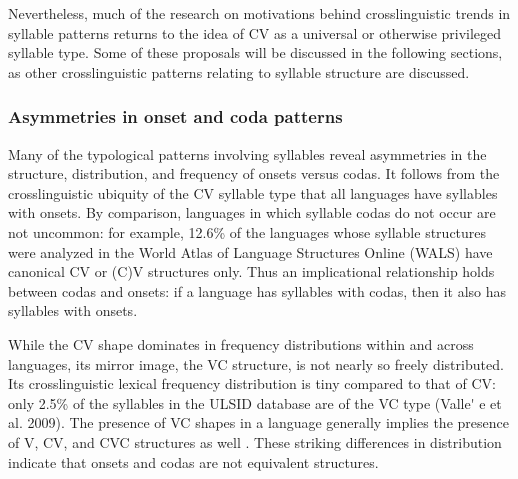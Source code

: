   Nevertheless, much of the research on motivations behind crosslinguistic trends in syllable patterns returns to the idea of CV as a universal or otherwise privileged syllable type. Some of these proposals will be discussed in the following sections, as other crosslinguistic patterns relating to syllable structure are discussed.

\subsubsection{{Asymmetries} {in} {onset} {and} {coda} {patterns}}\label{sec:1.1.2.2}

  Many of the typological patterns involving syllables reveal asymmetries in the structure, distribution, and frequency of onsets versus codas. It follows from the crosslinguistic ubiquity of the CV syllable type that all languages have syllables with onsets. By comparison, languages in which syllable codas do not occur are not uncommon: for example, 12.6\% of the languages whose syllable structures were analyzed in the World Atlas of Language Structures Online (WALS) have canonical CV or (C)V structures only. Thus an implicational relationship holds between codas and onsets: if a language has syllables with codas, then it also has syllables with onsets.

  While the CV shape dominates in frequency distributions within and across languages, its mirror image, the VC structure, is not nearly so freely distributed. Its crosslinguistic lexical frequency distribution is tiny compared to that of CV: only 2.5\% of the syllables in the ULSID database are of the VC type (Valle\'{} e et al. 2009). The presence of VC shapes in a language generally implies the presence of V, CV, and CVC structures as well \citep{Blevins1995}. These striking differences in distribution indicate that onsets and codas are not equivalent structures.

